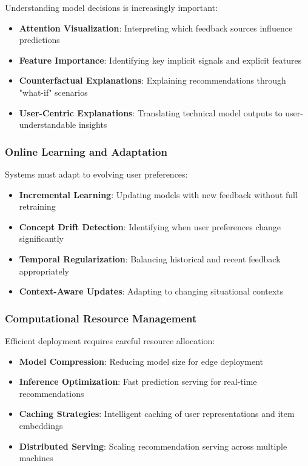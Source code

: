 \documentclass[acmsmall,review,anonymous]{acmart}
\begin{document}
Understanding model decisions is increasingly important:

\begin{itemize}
    \item \textbf{Attention Visualization}: Interpreting which feedback sources influence predictions
    \item \textbf{Feature Importance}: Identifying key implicit signals and explicit features
    \item \textbf{Counterfactual Explanations}: Explaining recommendations through "what-if" scenarios
    \item \textbf{User-Centric Explanations}: Translating technical model outputs to user-understandable insights
\end{itemize}

\subsubsection{Online Learning and Adaptation}

Systems must adapt to evolving user preferences:

\begin{itemize}
    \item \textbf{Incremental Learning}: Updating models with new feedback without full retraining
    \item \textbf{Concept Drift Detection}: Identifying when user preferences change significantly
    \item \textbf{Temporal Regularization}: Balancing historical and recent feedback appropriately
    \item \textbf{Context-Aware Updates}: Adapting to changing situational contexts
\end{itemize}

\subsubsection{Computational Resource Management}

Efficient deployment requires careful resource allocation:

\begin{itemize}
    \item \textbf{Model Compression}: Reducing model size for edge deployment
    \item \textbf{Inference Optimization}: Fast prediction serving for real-time recommendations
    \item \textbf{Caching Strategies}: Intelligent caching of user representations and item embeddings
    \item \textbf{Distributed Serving}: Scaling recommendation serving across multiple machines
\end{itemize}
\end{document}
